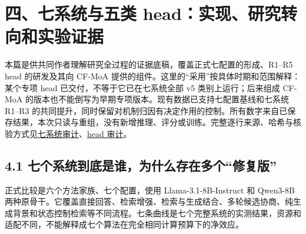 \documentclass[
  11pt,
  a4paper,
]{article}
\begin{document}
\label{heads-and-baselines}

\section{四、七系统与五类
head：实现、研究转向和实验证据}\label{ux56dbux4e03ux7cfbux7edfux4e0eux4e94ux7c7b-headux5b9eux73b0ux7814ux7a76ux8f6cux5411ux548cux5b9eux9a8cux8bc1ux636e}

本篇是供共同作者理解研究全过程的证据底稿，覆盖正式七配置的形成、R1--R5
head 的研发及其向 CF-MoA
提供的组件。这里的``采用''按具体时期和范围解释：某个专项 head
已交付，不等于它已在七系统全部 v5 类别上运行；后来组成 CF-MoA
的版本也不能倒写为早期专项版本。现有数据已支持七配置基线和七系统 R1--R3
的共同提升，同时保留对机制归因有决定作用的控制。所有数字来自已保存结果，本次只读与重组，没有新增推理、评分或训练。完整逐行来源、哈希与核验方式见\href{https://github.com/xiotakut/cf_mrg/blob/main/papers/2026-10-02_cf_moa/author_dossier/sources/13d3f2643dd3_seven_methods_audit.json}{七系统审计}、\href{https://github.com/xiotakut/cf_mrg/blob/main/papers/2026-10-02_cf_moa/author_dossier/sources/05945deac18d_head_research_audit.json}{head
审计}。

\subsection{4.1
七个系统到底是谁，为什么存在多个``修复版''}\label{ux4e03ux4e2aux7cfbux7edfux5230ux5e95ux662fux8c01ux4e3aux4ec0ux4e48ux5b58ux5728ux591aux4e2aux4feeux590dux7248}

正式比较是六个方法家族、七个配置，使用 Llama-3.1-8B-Instruct 和 Qwen3-8B
两种原骨干。它覆盖直接回答、检索增强、检索与生成结合、多轮候选协商、纯生成背景和状态控制检索等不同流程。七条曲线是七个完整系统的实测结果，资源和适配不同，不能解释成七个算法在完全相同计算预算下的净效应。
\end{document}
